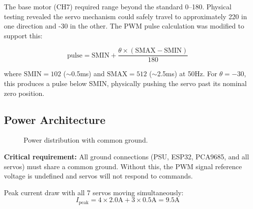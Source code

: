 \documentclass[12pt,a4paper]{article}
\begin{document}
The base motor (CH7) required range beyond the standard 0\textdegree--180\textdegree. Physical testing revealed the servo mechanism could safely travel to approximately 220\textdegree{} in one direction and -30\textdegree{} in the other. The PWM pulse calculation was modified to support this:

\begin{equation}
\text{pulse} = \text{SMIN} + \frac{\theta \times (\text{SMAX} - \text{SMIN})}{180}
\label{eq:pwm}
\end{equation}

where $\text{SMIN} = 102$ ($\sim$0.5ms) and $\text{SMAX} = 512$ ($\sim$2.5ms) at 50Hz. For $\theta = -30$, this produces a pulse below SMIN, physically pushing the servo past its nominal zero position.

\subsection{Power Architecture}

\begin{figure}[H]
\centering
{}
\caption{Power distribution with common ground.}
\label{fig:power}
\end{figure}

\textbf{Critical requirement:} All ground connections (PSU, ESP32, PCA9685, and all servos) must share a common ground. Without this, the PWM signal reference voltage is undefined and servos will not respond to commands.

Peak current draw with all 7 servos moving simultaneously:
\begin{equation}
I_{\text{peak}} = 4 \times 2.0\text{A} + 3 \times 0.5\text{A} = 9.5\text{A}
\end{equation}
\end{document}
